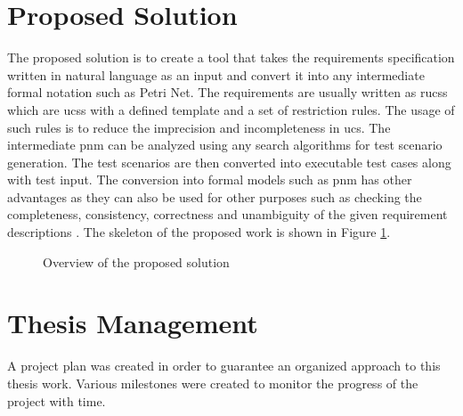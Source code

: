 \section{Proposed Solution}
The proposed solution is to create a tool that takes the requirements specification written in natural language as an input and convert it into any intermediate formal notation such as Petri Net. The requirements are usually written as \glspl{rucs} which are \glspl{ucs} with a defined template and a set of restriction rules. The usage of such rules is to reduce the imprecision and incompleteness in \gls{ucs}. The intermediate \gls{pnm} can be analyzed using any search algorithms for test scenario generation. The test scenarios are then converted into executable test cases along with test input. The conversion into formal models such as \gls{pnm} has other advantages as they can also be used for other purposes such as checking the completeness, consistency, correctness and unambiguity of the given requirement descriptions \cite{sarmiento2015analysis}. The skeleton of the proposed work is shown in Figure \ref{fig:proposed_solution}.
\begin{figure}[htb!]
\centering
{}
\caption{Overview of the proposed solution}
\label{fig:proposed_solution}
\end{figure}
\section{Thesis Management}
A project plan was created in order to guarantee an organized approach to this thesis work. Various milestones were created to monitor the progress of the project with time.
